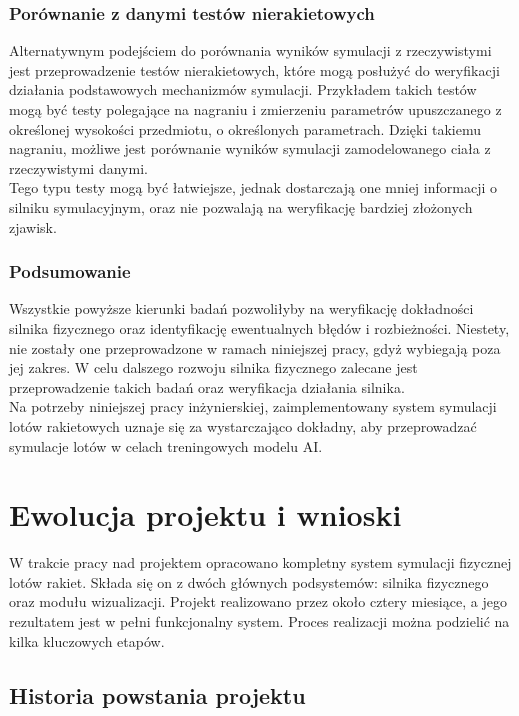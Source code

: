 \subsubsection{Porównanie z danymi testów nierakietowych}

Alternatywnym podejściem do porównania wyników symulacji z rzeczywistymi
jest przeprowadzenie testów nierakietowych, które mogą posłużyć do
weryfikacji działania podstawowych mechanizmów symulacji. Przykładem takich
testów mogą być testy polegające na nagraniu i zmierzeniu parametrów
upuszczanego z określonej wysokości przedmiotu, o określonych parametrach.
Dzięki takiemu nagraniu, możliwe jest porównanie wyników symulacji
zamodelowanego ciała z rzeczywistymi danymi.\\
Tego typu testy mogą być łatwiejsze, jednak dostarczają one mniej informacji
o silniku symulacyjnym, oraz nie pozwalają na weryfikację bardziej złożonych
zjawisk.

\subsubsection{Podsumowanie}

Wszystkie powyższe kierunki badań pozwoliłyby na weryfikację dokładności
silnika fizycznego oraz identyfikację ewentualnych błędów i rozbieżności.
Niestety, nie zostały one przeprowadzone w ramach niniejszej pracy, gdyż
wybiegają poza jej zakres. W celu dalszego rozwoju silnika fizycznego
zalecane jest przeprowadzenie takich badań oraz weryfikacja działania silnika.\\
Na potrzeby niniejszej pracy inżynierskiej, zaimplementowany system
symulacji lotów rakietowych uznaje się za wystarczająco dokładny, aby przeprowadzać symulacje lotów w
celach treningowych modelu AI.

\section{Ewolucja projektu i wnioski}\label{sec:ewolucja-projektu-i-wnioski}

W trakcie pracy nad projektem opracowano kompletny system symulacji fizycznej lotów rakiet. Składa się on z dwóch głównych podsystemów: silnika fizycznego oraz modułu wizualizacji. Projekt realizowano przez około cztery miesiące, a jego rezultatem jest w pełni funkcjonalny system. Proces realizacji można podzielić na kilka kluczowych etapów.

\subsection{Historia powstania projektu}

